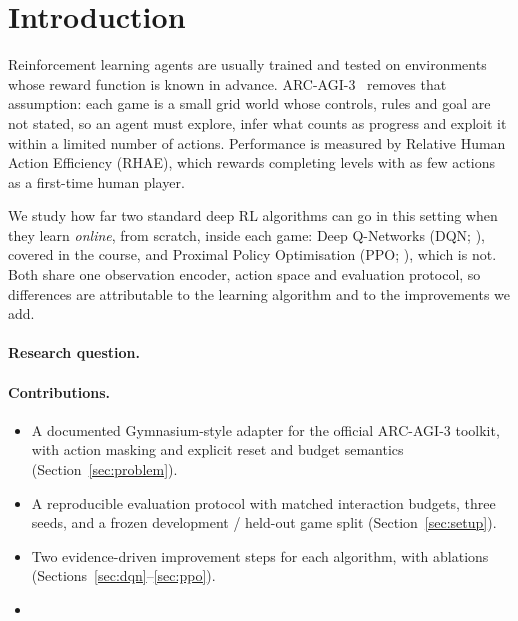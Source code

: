 \section{Introduction}

Reinforcement learning agents are usually trained and tested on environments
whose reward function is known in advance. ARC-AGI-3~\citep{arcagi3} removes
that assumption: each game is a small grid world whose controls, rules and goal
are not stated, so an agent must explore, infer what counts as progress and
exploit it within a limited number of actions. Performance is measured by
Relative Human Action Efficiency (RHAE), which rewards completing levels with
as few actions as a first-time human player.

We study how far two standard deep RL algorithms can go in this setting when
they learn \emph{online}, from scratch, inside each game: Deep Q-Networks
(DQN; \citealp{mnih2015dqn}), covered in the course, and Proximal Policy
Optimisation (PPO; \citealp{schulman2017ppo}), which is not. Both share one
observation encoder, action space and evaluation protocol, so differences are
attributable to the learning algorithm and to the improvements we add.

\paragraph{Research question.} 

\paragraph{Contributions.}
\begin{itemize}
  \item A documented Gymnasium-style adapter for the official ARC-AGI-3
        toolkit, with action masking and explicit reset and budget semantics
        (Section~\ref{sec:problem}).
  \item A reproducible evaluation protocol with matched interaction budgets,
        three seeds, and a frozen development / held-out game split
        (Section~\ref{sec:setup}).
  \item Two evidence-driven improvement steps for each algorithm, with
        ablations (Sections~\ref{sec:dqn}--\ref{sec:ppo}).
  \item {}
\end{itemize}
